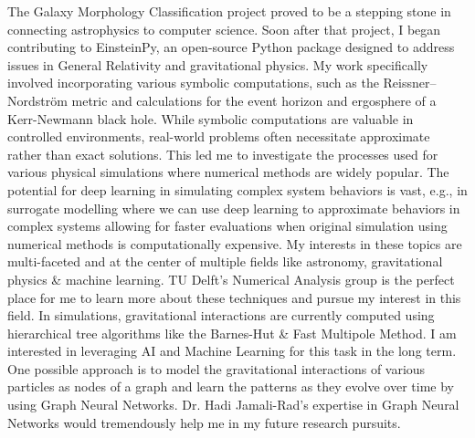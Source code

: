 \documentclass{article}
\begin{document}
\vspace{5pt}
\hspace{0.25in}The Galaxy Morphology Classification project proved to be a
stepping stone in connecting astrophysics to computer science. Soon after that
project, I began contributing to EinsteinPy, an open-source Python package
designed to address issues in General Relativity and gravitational physics. My
work specifically involved incorporating various symbolic computations, such as
the Reissner–Nordström metric and calculations for the event horizon and
ergosphere of a Kerr-Newmann black hole. While symbolic computations are
valuable in controlled environments, real-world problems often necessitate
approximate rather than exact solutions. This led me to investigate the
processes used for various physical simulations where numerical methods are
widely popular. The potential for deep learning in simulating complex system
behaviors is vast, e.g., in surrogate modelling where we can use deep learning
to approximate behaviors in complex systems allowing for faster evaluations when
original simulation using numerical methods is computationally expensive. My
interests in these topics are multi-faceted and at the center of multiple fields
like astronomy, gravitational physics \& machine learning. TU Delft’s Numerical
Analysis group is the perfect place for me to learn more about these techniques
and pursue my interest in this field. In simulations, gravitational interactions
are currently computed using hierarchical tree algorithms like the Barnes-Hut \&
Fast Multipole Method. I am interested in leveraging AI and Machine Learning for
this task in the long term. One possible approach is to model the gravitational
interactions of various particles as nodes of a graph and learn the patterns as
they evolve over time by using Graph Neural Networks. Dr. Hadi Jamali-Rad’s
expertise in Graph Neural Networks would tremendously help me in my future
research pursuits. 
\end{document}
